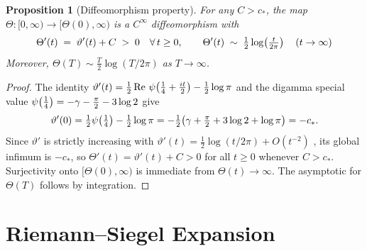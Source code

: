 \documentclass{amsart}
\newcommand{\tmop}[1]{\ensuremath{\operatorname{#1}}}
\newtheorem{proposition}{Proposition}
{\theoremstyle{remark}\newtheorem{remark}{Remark}}
\newcommand{\Rea}{\tmop{Re}}
\begin{document}
\begin{proposition}
  [Diffeomorphism property]\label{prop:diffeo} For any $C > c_{\ast}$, the map
  $\Theta : [0, \infty) \to [\Theta (0), \infty)$ is a $C^{\infty}$
  diffeomorphism with
  \begin{equation}
    \Theta' (t) \hspace{0.27em} = \hspace{0.27em} \vartheta' (t) + C
    \hspace{0.27em} > \hspace{0.27em} 0 \quad \forall \hspace{0.17em} t \ge 0,
    \qquad \Theta' (t) \hspace{0.27em} \sim \hspace{0.27em} \tfrac{1}{2} \log
    \hspace{-0.17em} \left( \tfrac{t}{2 \pi} \right)  \quad (t \to \infty)
  \end{equation}
  Moreover, $\Theta (T) \sim \tfrac{T}{2} \log (T / 2 \pi)$ as $T \to \infty$.
\end{proposition}

\begin{proof}
  The identity $\vartheta' (t) = \tfrac{1}{2} \Rea \hspace{0.17em} \psi
  \hspace{-0.17em} \left( \tfrac{1}{4} + \tfrac{it}{2} \right) - \tfrac{1}{2}
  \log \pi$ and the digamma special value $\psi \hspace{-0.17em} \left(
  \tfrac{1}{4} \right) = - \gamma - \tfrac{\pi}{2} - 3 \log 2$ give
  \begin{equation}
    \vartheta' (0) = \tfrac{1}{2} \psi \hspace{-0.17em} \left( \tfrac{1}{4}
    \right) - \tfrac{1}{2} \log \pi = - \tfrac{1}{2} \hspace{-0.17em} \left(
    \gamma + \tfrac{\pi}{2} + 3 \log 2 + \log \pi \right) = - c_{\ast} .
  \end{equation}
  Since $\vartheta'$ is strictly increasing with $\vartheta' (t) =
  \tfrac{1}{2} \log (t / 2 \pi) + O (t^{- 2})$ {\cite{Titchmarsh1986}}, its
  global infimum is $- c_{\ast}$, so $\Theta' (t) = \vartheta' (t) + C > 0$
  for all $t \ge 0$ whenever $C > c_{\ast}$. Surjectivity onto $[\Theta (0),
  \infty)$ is immediate from $\Theta (t) \to \infty$. The asymptotic for
  $\Theta (T)$ follows by integration.
\end{proof}

\section{Riemann--Siegel Expansion}
\end{document}
